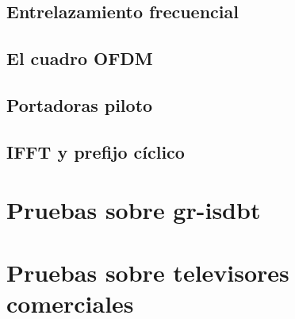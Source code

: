 \subsection{Entrelazamiento frecuencial}

\subsection{El cuadro OFDM}

\subsection{Portadoras piloto}

\subsection{IFFT y prefijo cíclico}

\section{Pruebas sobre gr-isdbt}



\section{Pruebas sobre televisores comerciales}